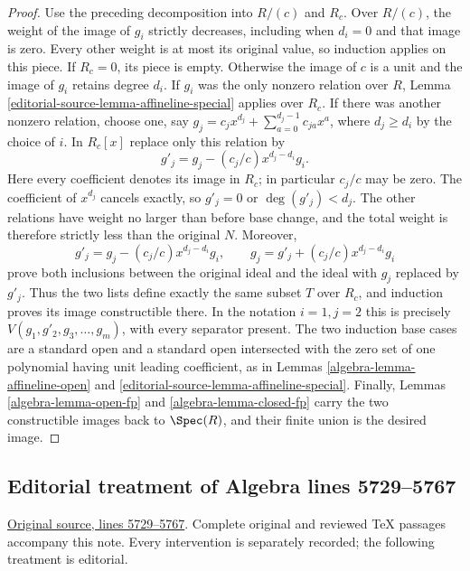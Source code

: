 \begin{proof}
\medskip\noindent
Use the preceding decomposition into $R/(c)$ and $R_c$. Over $R/(c)$,
the weight of the image of $g_i$ strictly decreases, including when
$d_i=0$ and that image is zero. Every other weight is at most its
original value, so induction applies on this piece.
If $R_c=0$, its piece is empty. Otherwise the image of $c$ is a unit
and the image of $g_i$ retains degree $d_i$. If $g_i$ was the only
nonzero relation over $R$, Lemma \ref{editorial-source-lemma-affineline-special}
applies over $R_c$. If there was another nonzero relation, choose
one, say
$g_j=c_jx^{d_j}+\sum_{a=0}^{d_j-1}c_{ja}x^a$, where $d_j\geq d_i$
by the choice of $i$. In $R_c[x]$ replace only this relation by
$$
g'_j=g_j-(c_j/c)x^{d_j-d_i}g_i.
$$
Here every coefficient denotes its image in $R_c$; in particular
$c_j/c$ may be zero. The coefficient of $x^{d_j}$ cancels exactly,
so $g'_j=0$ or $\deg(g'_j)<d_j$. The other relations have weight
no larger than before base change, and the total weight is therefore
strictly less than the original $N$. Moreover,
$$
g'_j=g_j-(c_j/c)x^{d_j-d_i}g_i,\qquad
g_j=g'_j+(c_j/c)x^{d_j-d_i}g_i
$$
prove both inclusions between the original ideal and the ideal with
$g_j$ replaced by $g'_j$. Thus the two lists define exactly the same
subset $T$ over $R_c$, and induction proves its image constructible
there. In the notation $i=1,j=2$ this is precisely
$V(g_1,g'_2,g_3,\ldots,g_m)$, with every separator present.
The two induction base cases are a standard open and a standard open
intersected with the zero set of one polynomial having unit leading
coefficient, as in Lemmas \ref{algebra-lemma-affineline-open} and
\ref{editorial-source-lemma-affineline-special}. Finally,
Lemmas \ref{algebra-lemma-open-fp} and \ref{algebra-lemma-closed-fp} carry the two
constructible images back to $\Spec(R)$, and their finite union is
the desired image.
\end{proof}


\subsection{Editorial treatment of Algebra lines 5729--5767}

\hypertarget{algebra-context-039}{}

\noindent\href{https://github.com/stacks/stacks-project/blob/a04446e57ec1fbc252a871afcec7752fb2807b14/algebra.tex\#L5729}{Original source, lines 5729--5767}. Complete original and reviewed TeX passages accompany this note. Every intervention is separately recorded; the following treatment is editorial.


